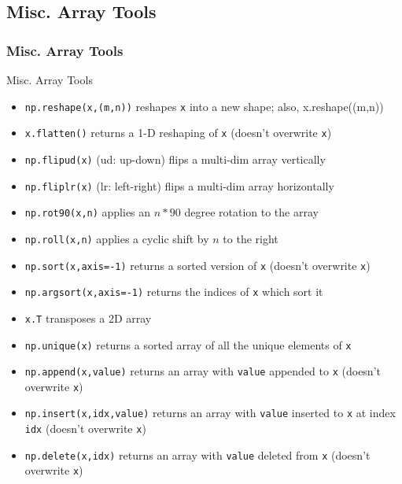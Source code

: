 \documentclass{beamer}
\newcommand{\code}[1]{\texttt{#1}}
\begin{document}
\subsection{Misc. Array Tools}

\begin{frame}	
	\frametitle{Misc. Array Tools}
	
	\begin{block}{Misc. Array Tools}
		\begin{scriptsize}
		\begin{itemize}
			\item \code{np.reshape(x,(m,n))} reshapes \code{x} into a new shape; also, x.reshape((m,n))
			\item \code{x.flatten()} returns a 1-D reshaping of \code{x} (doesn't overwrite \code{x})
			\item \code{np.flipud(x)} (ud: up-down) flips a multi-dim array vertically
			\item \code{np.fliplr(x)} (lr: left-right) flips a multi-dim array horizontally
			\item \code{np.rot90(x,n)} applies an $n*90$ degree rotation to the array
			\item \code{np.roll(x,n)} applies a cyclic shift by $n$ to the right
			\item \code{np.sort(x,axis=-1)} returns a sorted version of \code{x} (doesn't overwrite \code{x})
			\item \code{np.argsort(x,axis=-1)} returns the indices of \code{x} which sort it
			\item \code{x.T} transposes a 2D array
			\item \code{np.unique(x)} returns a sorted array of all the unique elements of \code{x}
			\item \code{np.append(x,value)} returns an array with \code{value} appended to \code{x} (doesn't overwrite \code{x})
			\item \code{np.insert(x,idx,value)} returns an array with \code{value} inserted to \code{x} at index \code{idx} (doesn't overwrite \code{x})
			\item \code{np.delete(x,idx)} returns an array with \code{value} deleted from \code{x} (doesn't overwrite \code{x})
		\end{itemize}
		\end{scriptsize}
	\end{block}
	
\end{frame}
\end{document}
